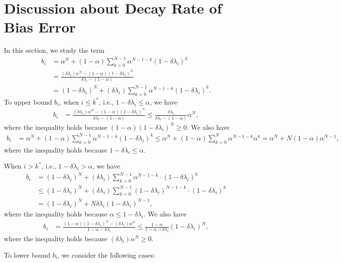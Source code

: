 \documentclass[11pt]{article}
\begin{document}
\section{Discussion about Decay Rate of Bias Error}
In this section, we study the term
\begin{align*}
b_i&=\alpha^N+(1-\alpha)\sum_{k=0}^{N-1}\alpha^{N-1-k}(1-\delta\lambda_i)^k\\
&=\frac{(\delta\lambda_i)\alpha^N-(1-\alpha)(1-\delta\lambda_i)^N}{\delta\lambda_i-(1-\alpha)}\\
&=(1-\delta\lambda_i)^N+(\delta\lambda_i)\sum_{k=0}^{N-1}\alpha^{N-1-k}(1-\delta\lambda_i)^k.
\end{align*}
To upper bound $b_i$, when $i\le k^*$, i.e., $1-\delta\lambda_i\le\alpha$, we have
\begin{align*}
b_i&=\frac{(\delta\lambda_i)\alpha^N-(1-\alpha)(1-\delta\lambda_i)^N}{\delta\lambda_i-(1-\alpha)}\le\frac{\delta\lambda_i}{\delta\lambda_i-(1-\alpha)}\alpha^N,
\end{align*}
where the inequality holds because $(1-\alpha)(1-\delta\lambda_i)^N\ge0$. We also have
\begin{align*}
b_i&=\alpha^N+(1-\alpha)\sum_{k=0}^{N-1}\alpha^{N-1-k}(1-\delta\lambda_i)^k\le\alpha^N+(1-\alpha)\sum_{k=0}^N\alpha^{N-1-k}\alpha^k=\alpha^N+N(1-\alpha)\alpha^{N-1},
\end{align*}
where the inequality holds because $1-\delta\lambda_i\le\alpha$.

When $i>k^*$, i.e., $1-\delta\lambda_i>\alpha$, we have
\begin{align*}
b_i&=(1-\delta\lambda_i)^N+(\delta\lambda_i)\sum_{k=0}^{N-1}\alpha^{N-1-k}\cdot(1-\delta\lambda_i)^k\\
&\le(1-\delta\lambda_i)^N+(\delta\lambda_i)\sum_{k=0}^{N-1}(1-\delta\lambda_i)^{N-1-k}\cdot(1-\delta\lambda_i)^k\\
&=(1-\delta\lambda_i)^N+N\delta\lambda_i(1-\delta\lambda_i)^{N-1},
\end{align*}
where the inequality holds because $\alpha\le1-\delta\lambda_i$. We also have
\begin{align*}
b_i&=\frac{(1-\alpha)(1-\delta\lambda_i)^N-(\delta\lambda_i)\alpha^N}{1-\alpha-\delta\lambda_i}\le\frac{1-\alpha}{1-\alpha-\delta\lambda_i}(1-\delta\lambda_i)^N,
\end{align*}
where the inequality holds because $(\delta\lambda_i)\alpha^N\ge0$.


To lower bound $b_i$, we consider the following cases:
\end{document}
